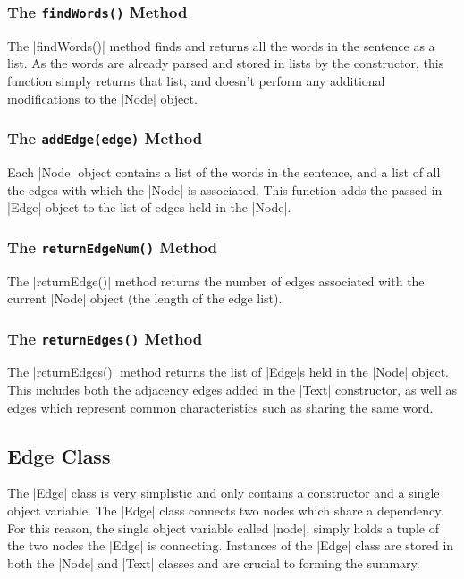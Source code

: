 	\subsubsection{The {\tt findWords()} Method}
	The |findWords()| method finds and returns all the words in the sentence as a list. As the words are already parsed and stored in lists by the constructor, this function simply returns that list, and doesn't perform any additional modifications to the |Node| object.
	
	\subsubsection{The {\tt addEdge(edge)} Method}	
	Each |Node| object contains a list of the words in the sentence, and a list of all the edges with which the |Node| is associated. This function adds the passed in |Edge| object to the list of edges held in the |Node|.
	
	\subsubsection{The {\tt returnEdgeNum()} Method}
	The |returnEdge()| method returns the number of edges associated with the current |Node| object (\ie the length of the edge list).
	
	\subsubsection{The {\tt returnEdges()} Method}
	The |returnEdges()| method returns the list of |Edge|s held in the |Node| object. This includes both the adjacency edges added in the |Text| constructor, as well as edges which represent common characteristics such as sharing the same word.
		
\subsection{Edge Class}
	
	The |Edge| class is very simplistic and only contains a constructor and a single object variable. The |Edge| class connects two nodes which share a dependency. For this reason, the single object variable called |node|, simply holds a tuple of the two nodes the |Edge| is connecting. Instances of the |Edge| class are stored in both the |Node| and |Text| classes and are crucial to forming the summary.
